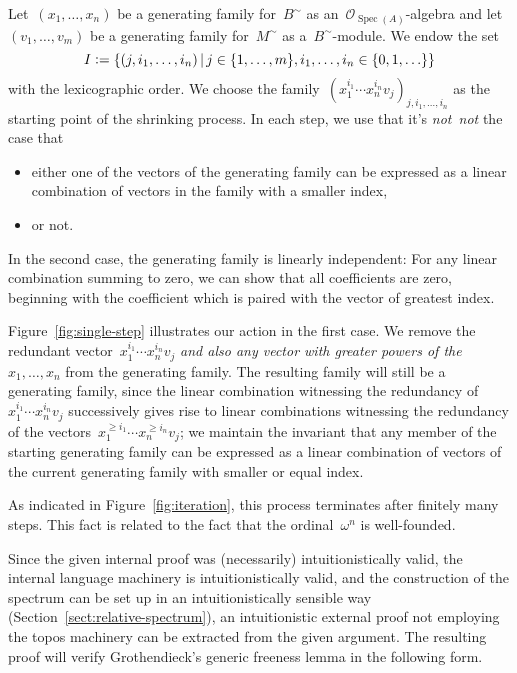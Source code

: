 \documentclass[10pt,reqno,a4paper]{amsbook}
\makeatletter
\theoremstyle{definition}
\theoremstyle{plain}
\theoremstyle{remark}
\renewcommand{\O}{\mathcal{O}}
\DeclareMathOperator{\Spec}{Spec}
\newcommand{\?}{\,{:}\,}
\renewcommand{\_}{\mathpunct{.}\,}
\newcommand{\notnot}{\emph{not~not}\xspace}
\newcommand{\defeq}{\vcentcolon=}
\renewenvironment{proof}[1][\proofname]{\par
  \pushQED{\qed}%
  \normalfont \topsep6\p@\@plus6\p@\relax
  \trivlist
  \item[\hskip\labelsep
        \itshape
    #1\@addpunct{.}]\ignorespaces
}{%
  \popQED\endtrivlist\@endpefalse
}
\makeatother
\begin{document}
\begin{proof}[Proof of Theorem~\ref{thm:generic-freeness}]
Let~$(x_1,\ldots,x_n)$ be a generating family for~$B^\sim$ as
an~$\O_{\Spec(A)}$-algebra and let $(v_1,\ldots,v_m)$ be a generating
family for~$M^\sim$ as a~$B^\sim$-module. We endow the set
\[ I \defeq \{ (j, i_1,\ldots,i_n) \,|\,
  j \in \{ 1,\ldots,m \},
  i_1,\ldots,i_n \in \{ 0,1,\ldots \} \} \]
with the lexicographic order. We choose the family~$(x_1^{i_1} \cdots x_n^{i_n}
v_j)_{j,i_1,\ldots,i_n}$ as the starting point of the shrinking process. In
each step, we use that it's \notnot the case that
\begin{itemize}
\item either one of the vectors of the generating family can be expressed as a
linear combination of vectors in the family with a smaller index,
\item or not.
\end{itemize}

In the second case, the generating family is linearly independent: For any
linear combination summing to zero, we can show that all coefficients are zero,
beginning with the coefficient which is paired with the vector of greatest
index.

Figure~\ref{fig:single-step} illustrates our action in the first case. We remove the redundant vector~$x_1^{i_1} \cdots x_n^{i_n}
v_j$ \emph{and also any vector with greater powers of the~$x_1,\ldots,x_n$}
from the generating family. The resulting family will still be a generating
family, since the linear combination witnessing the redundancy of~$x_1^{i_1}
\cdots x_n^{i_n} v_j$ successively gives rise to linear combinations witnessing
the redundancy of the vectors~$x_1^{\geq i_1} \cdots x_n^{\geq i_n} v_j$;
we maintain the invariant that any member of the starting generating family can
be expressed as a linear combination of vectors of the current generating
family with smaller or equal index.

As indicated in Figure~\ref{fig:iteration}, this process terminates after
finitely many steps. This fact is related to the fact that the ordinal~$\omega^n$ is
well-founded.
\end{proof}


Since the given internal proof was (necessarily) intuitionistically valid, the
internal language machinery is intuitionistically valid, and the construction
of the spectrum can be set up in an intuitionistically sensible way
(Section~\ref{sect:relative-spectrum}), an intuitionistic external proof not
employing the topos machinery can be extracted from the given argument.
The resulting proof will verify Grothendieck's generic freeness lemma in the
following form.
\end{document}
